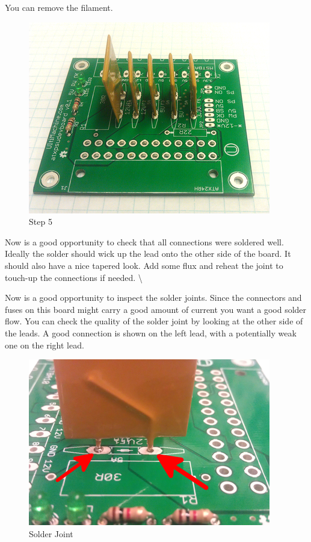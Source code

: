 You can remove the filament.

\begin{figure}[htbp]
\centering
\includegraphics{./png/step-05.png}
\caption{Step 5}
\end{figure}

Now is a good opportunity to check that all connections were soldered
well. Ideally the solder should wick up the lead onto the other side of
the board. It should also have a nice tapered look. Add some flux and
reheat the joint to touch-up the connections if needed. \textbackslash{}

Now is a good opportunity to inspect the solder joints. Since the
connectors and fuses on this board might carry a good amount of current
you want a good solder flow. You can check the quality of the solder
joint by looking at the other side of the leads. A good connection is
shown on the left lead, with a potentially weak one on the right lead.

\begin{figure}[htbp]
\centering
\includegraphics{./png/solder-joint.png}
\caption{Solder Joint}
\end{figure}


